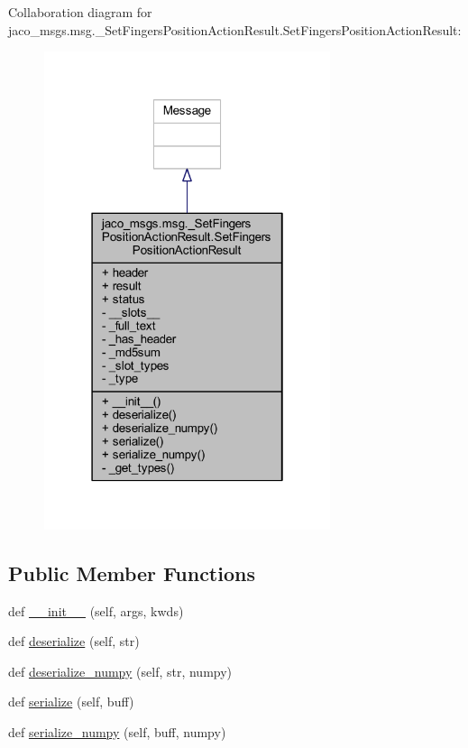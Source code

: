 Collaboration diagram for jaco\+\_\+msgs.\+msg.\+\_\+\+Set\+Fingers\+Position\+Action\+Result.\+Set\+Fingers\+Position\+Action\+Result\+:
\nopagebreak
\begin{figure}[H]
\begin{center}
\leavevmode
\includegraphics[width=238pt]{df/d81/classjaco__msgs_1_1msg_1_1__SetFingersPositionActionResult_1_1SetFingersPositionActionResult__coll__graph}
\end{center}
\end{figure}
\subsection*{Public Member Functions}
\begin{DoxyCompactItemize}
\item 
def \hyperlink{classjaco__msgs_1_1msg_1_1__SetFingersPositionActionResult_1_1SetFingersPositionActionResult_ab7d3865d51b2f73d3890976c813b643a}{\+\_\+\+\_\+init\+\_\+\+\_\+} (self, args, kwds)
\item 
def \hyperlink{classjaco__msgs_1_1msg_1_1__SetFingersPositionActionResult_1_1SetFingersPositionActionResult_a9ce823323270871a996670d1c01d6a7f}{deserialize} (self, str)
\item 
def \hyperlink{classjaco__msgs_1_1msg_1_1__SetFingersPositionActionResult_1_1SetFingersPositionActionResult_a785f9ac186bc2e319e7c518f3df31572}{deserialize\+\_\+numpy} (self, str, numpy)
\item 
def \hyperlink{classjaco__msgs_1_1msg_1_1__SetFingersPositionActionResult_1_1SetFingersPositionActionResult_a33d42f45bc8af3ac98fbf107629c7fa9}{serialize} (self, buff)
\item 
def \hyperlink{classjaco__msgs_1_1msg_1_1__SetFingersPositionActionResult_1_1SetFingersPositionActionResult_a0ef80ec8cb003555516cce0ce2d7c54b}{serialize\+\_\+numpy} (self, buff, numpy)
\end{DoxyCompactItemize}
